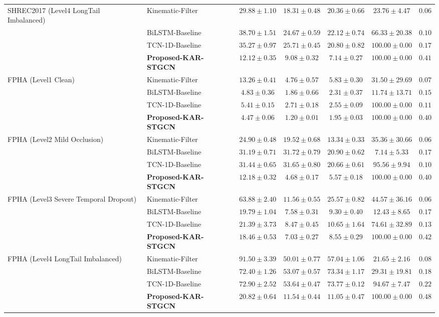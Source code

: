 \begin{table}[htbp]
{\begin{tabular}{llccccc}
\midrule
SHREC2017 (Level4 LongTail Imbalanced) & Kinematic-Filter & $29.88 \pm 1.10$ & $18.31 \pm 0.48$ & $20.36 \pm 0.66$ & $23.76 \pm 4.47$ & $0.06$ \\
 & BiLSTM-Baseline & $38.70 \pm 1.51$ & $24.67 \pm 0.59$ & $22.12 \pm 0.74$ & $66.33 \pm 20.38$ & $0.10$ \\
 & TCN-1D-Baseline & $35.27 \pm 0.97$ & $25.71 \pm 0.45$ & $20.80 \pm 0.82$ & $100.00 \pm 0.00$ & $0.17$ \\
 & \textbf{Proposed-KAR-STGCN} & $12.12 \pm 0.35$ & $9.08 \pm 0.32$ & $7.14 \pm 0.27$ & $100.00 \pm 0.00$ & $0.41$ \\
\midrule
FPHA (Level1 Clean) & Kinematic-Filter & $13.26 \pm 0.41$ & $4.76 \pm 0.57$ & $5.83 \pm 0.30$ & $31.50 \pm 29.69$ & $0.07$ \\
 & BiLSTM-Baseline & $4.83 \pm 0.36$ & $1.86 \pm 0.66$ & $2.31 \pm 0.37$ & $11.74 \pm 13.71$ & $0.15$ \\
 & TCN-1D-Baseline & $5.41 \pm 0.15$ & $2.71 \pm 0.18$ & $2.55 \pm 0.09$ & $100.00 \pm 0.00$ & $0.11$ \\
 & \textbf{Proposed-KAR-STGCN} & $4.47 \pm 0.06$ & $1.20 \pm 0.01$ & $1.95 \pm 0.03$ & $100.00 \pm 0.00$ & $0.40$ \\
\midrule
FPHA (Level2 Mild Occlusion) & Kinematic-Filter & $24.90 \pm 0.48$ & $19.52 \pm 0.68$ & $13.34 \pm 0.33$ & $35.36 \pm 30.66$ & $0.06$ \\
 & BiLSTM-Baseline & $31.19 \pm 0.71$ & $31.72 \pm 0.79$ & $20.90 \pm 0.62$ & $7.14 \pm 5.33$ & $0.17$ \\
 & TCN-1D-Baseline & $31.44 \pm 0.65$ & $31.65 \pm 0.80$ & $20.66 \pm 0.61$ & $95.56 \pm 9.94$ & $0.10$ \\
 & \textbf{Proposed-KAR-STGCN} & $12.18 \pm 0.32$ & $4.68 \pm 0.17$ & $5.57 \pm 0.18$ & $100.00 \pm 0.00$ & $0.40$ \\
\midrule
FPHA (Level3 Severe Temporal Dropout) & Kinematic-Filter & $63.88 \pm 2.40$ & $11.56 \pm 0.55$ & $25.57 \pm 0.82$ & $44.57 \pm 36.16$ & $0.06$ \\
 & BiLSTM-Baseline & $19.79 \pm 1.04$ & $7.58 \pm 0.31$ & $9.30 \pm 0.40$ & $12.43 \pm 8.65$ & $0.17$ \\
 & TCN-1D-Baseline & $21.39 \pm 3.73$ & $8.47 \pm 0.45$ & $10.65 \pm 1.64$ & $74.61 \pm 32.89$ & $0.13$ \\
 & \textbf{Proposed-KAR-STGCN} & $18.46 \pm 0.53$ & $7.03 \pm 0.27$ & $8.55 \pm 0.29$ & $100.00 \pm 0.00$ & $0.42$ \\
\midrule
FPHA (Level4 LongTail Imbalanced) & Kinematic-Filter & $91.50 \pm 3.39$ & $50.01 \pm 0.77$ & $57.04 \pm 1.06$ & $21.65 \pm 2.16$ & $0.08$ \\
 & BiLSTM-Baseline & $72.40 \pm 1.26$ & $53.07 \pm 0.57$ & $73.34 \pm 1.17$ & $29.31 \pm 19.81$ & $0.18$ \\
 & TCN-1D-Baseline & $72.90 \pm 2.52$ & $53.64 \pm 0.47$ & $73.77 \pm 0.12$ & $94.67 \pm 7.47$ & $0.22$ \\
 & \textbf{Proposed-KAR-STGCN} & $20.82 \pm 0.64$ & $11.54 \pm 0.44$ & $11.05 \pm 0.47$ & $100.00 \pm 0.00$ & $0.48$ \\
\bottomrule
\end{tabular}%
}
\end{table}